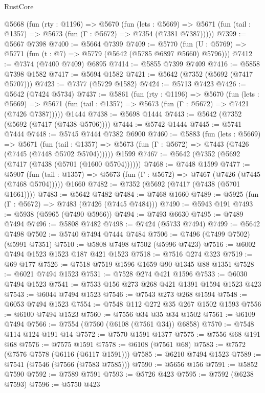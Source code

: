 \begin{lexlean}{RustCore}
\begin{coremodule}
  @5668
    (fun (rty : @1196) =>
    @5670
      (fun (lets : @5669) =>
      @5671 (fun (tail : @1357) => @5673 (fun (Γ : @5672) => @7354 (@7381 @7387)))))
@7399 := @5667 @7398
@7400 := @5664 @7399
@7409 := @5770 (fun (U : @5769) => @5771 (fun (t : @7) => @5779 (@5642 (@5785 @6897 @5660) @5796)))
@7412 := @7374 (@7400 @7409) @6895
@7414 := @5855 @7399 @7409
@7416 := @5858 @7398 @1582
@7417 := @5694 @1582
@7421 := @5642 (@7352 (@5692 (@7417 @5707)))
@7423 := @7377 (@5729 @1582)
@7424 := @5713 @7423
@7426 := @5642 (@7424 @5734)
@7437 := @5861
    (fun (rty : @1196) =>
    @5670
      (fun (lets : @5669) =>
      @5671 (fun (tail : @1357) => @5673 (fun (Γ : @5672) => @7421 (@7426 @7387)))))
    @1444
@7438 := @5698 @1444
@7443 := @5642 (@7352 (@5692 (@7417 (@7438 @5706))))
@7444 := @5742 @1444
@7445 := @5741 @7444
@7448 := @5745 @7444 @7382 @6900
@7460 := @5883
    (fun (lets : @5669) =>
    @5671
      (fun (tail : @1357) => @5673 (fun (Γ : @5672) => @7443 (@7426 (@7445 (@7448 @5702 @5704))))))
    @1599
@7467 := @5642 (@7352 (@5692 (@7417 (@7438 (@5701 (@1600 @5704))))))
@7468 := @7448 @1599
@7477 := @5907
    (fun (tail : @1357) => @5673 (fun (Γ : @5672) => @7467 (@7426 (@7445 (@7468 @5704)))))
    @1660
@7482 := @7352 (@5692 (@7417 (@7438 (@5701 @1661))))
@7483 := @5642 @7482
@7484 := @7468 @1660
@7489 := @5925 (fun (Γ : @5672) => @7483 (@7426 (@7445 @7484)))
@7490 := @5943 @191
@7493 := @5938 (@5965 (@7490 @5966))
@7494 := @7493 @6630
@7495 := @7489 @7494
@7496 := @5808 @7482
@7498 := @7424 (@5733 @7494)
@7499 := @5642 @7498
@7502 := @5740 @7494 @7444 @7484
@7506 := @7496 (@7499 @7502) (@5991 @7351)
@7510 := @5808 @7498 @7502 (@5996 @7423)
@7516 := @6002 @7494 @1523 @1523 @187 @421 @1523
@7518 := @7516 @274 @323
@7519 := @69 @177
@7526 := @7518 @7519 @1596 @1659 @90 @1345 @88 @1351
@7528 := @6021 @7494 @1523
@7531 := @7528 @274 @421 @1596
@7533 := @6030 @7494 @1523
@7541 := @7533 @156 @273 @268 @421 @1391 @1594 @1523 @423
@7543 := @6044 @7494 @1523
@7546 := @7543 @273 @268 @1594
@7548 := @6053 @7494 @1523
@7554 := @7548 @112 @272 @35 @267 @1502 @1593
@7556 := @6100 @7494 @1523
@7560 := @7556 @34 @35 @34 @1502
@7561 := @6109 @7494
@7566 := @7554 (@7560 (@6108 (@7561 @34)) @6858)
@7570 := @7548 @114 @124 @191 @14
@7572 := @7570 @1591 @1377
@7575 := @7556 @68 @191 @68
@7576 := @7575 @1591
@7578 := @6108 (@7561 @68)
@7583 := @7572 (@7576 @7578 (@6116 (@6117 @1591)))
@7585 := @6210 @7494 @1523
@7589 := @7541 (@7546 (@7566 (@7583 @7585)))
@7590 := @5656 @156
@7591 := @5852 @7590
@7592 := @7589 @7591
@7593 := @5726 @423
@7595 := @7592 (@6238 @7593)
@7596 := @5750 @423

\end{coremodule}
\end{lexlean}
